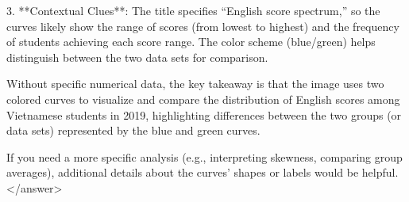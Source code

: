 3. **Contextual Clues**: The title specifies “English score spectrum,” so the curves likely show the range of scores (from lowest to highest) and the frequency of students achieving each score range. The color scheme (blue/green) helps distinguish between the two data sets for comparison.  

Without specific numerical data, the key takeaway is that the image uses two colored curves to visualize and compare the distribution of English scores among Vietnamese students in 2019, highlighting differences between the two groups (or data sets) represented by the blue and green curves.  

If you need a more specific analysis (e.g., interpreting skewness, comparing group averages), additional details about the curves’ shapes or labels would be helpful.</answer>